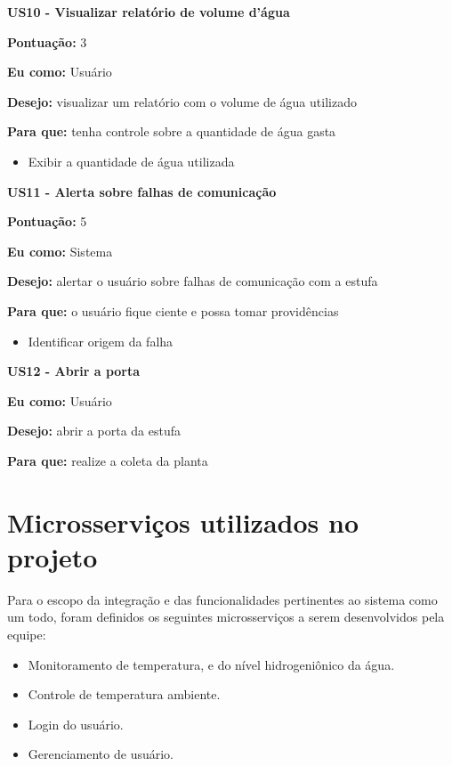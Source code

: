 \textbf{US10 - Visualizar relatório de volume d’água}

\textbf{Pontuação:} 3

\textbf{Eu como:} Usuário

\textbf{Desejo:} visualizar um relatório com o volume de água utilizado

\textbf{Para que:} tenha controle sobre a quantidade de água gasta

\begin{itemize}
	\item Exibir a quantidade de água utilizada
	
\end{itemize}

\textbf{US11 - Alerta sobre falhas de comunicação}

\textbf{Pontuação:} 5

\textbf{Eu como:} Sistema

\textbf{Desejo:} alertar o usuário sobre falhas de comunicação com a estufa

\textbf{Para que:} o usuário fique ciente e possa tomar providências

\begin{itemize}
	\item Identificar origem da falha
	
\end{itemize}

\textbf{US12 - Abrir a porta}

\textbf{Eu como:} Usuário

\textbf{Desejo:} abrir a porta da estufa

\textbf{Para que:} realize a coleta da planta


\section{Microsserviços utilizados no projeto}

Para o escopo da integração e das funcionalidades pertinentes ao sistema como um todo, foram definidos os seguintes microsserviços a serem desenvolvidos pela equipe:

\begin{itemize}
	\item Monitoramento de temperatura, e do nível hidrogeniônico da água.
	\item Controle de temperatura ambiente.
	\item Login do usuário.
	\item Gerenciamento de usuário.
\end{itemize}


